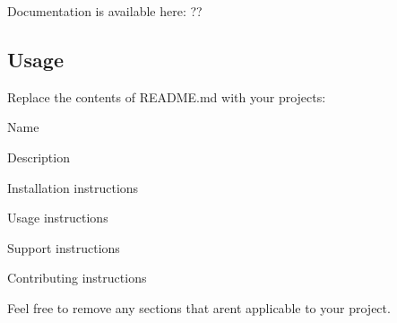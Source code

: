 Documentation is available here\+: ??

\subsection*{Usage}

Replace the contents of {\ttfamily R\+E\+A\+D\+M\+E.\+md} with your project\textquotesingle{}s\+:


\begin{DoxyItemize}
\item Name
\item Description
\item Installation instructions
\item Usage instructions
\item Support instructions
\item Contributing instructions
\end{DoxyItemize}

Feel free to remove any sections that aren\textquotesingle{}t applicable to your project. 